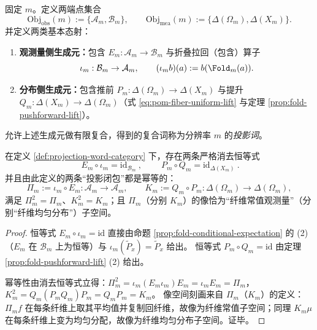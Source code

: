 \begin{definition}\label{def:projection-word-category}
固定 \(m\)。定义两端点集合
\[
\mathrm{Obj}_{\mathrm{obs}}(m):=\{\mathcal{A}_m,\mathcal{B}_m\},\qquad
\mathrm{Obj}_{\mathrm{mea}}(m):=\{\Delta(\Omega_m),\Delta(X_m)\}.
\]
并定义两类基本态射：
\begin{enumerate}
  \item \textbf{观测量侧生成元：}包含 \(E_m:\mathcal{A}_m\to\mathcal{B}_m\) 与折叠拉回（包含）算子
  \[
  \iota_m:\mathcal{B}_m\to\mathcal{A}_m,\qquad
  (\iota_m b)(a):=b(\Fold_m(a)).
  \]
  \item \textbf{分布侧生成元：}包含推前 \(P_m:\Delta(\Omega_m)\to\Delta(X_m)\) 与提升 \(Q_m:\Delta(X_m)\to\Delta(\Omega_m)\)（式 \eqref{eq:pom-fiber-uniform-lift} 与定理 \ref{prop:fold-pushforward-lift}）。
\end{enumerate}
允许上述生成元做有限复合，得到的复合词称为分辨率 \(m\) 的\emph{投影词}。
\end{definition}

\begin{proposition}[基本消去规则与幂等投影]\label{prop:projection-word-rewrite}
在定义 \ref{def:projection-word-category} 下，存在两条严格消去恒等式
\[
\boxed{\ E_m\circ \iota_m=\mathrm{id}_{\mathcal{B}_m}\ },\qquad
\boxed{\ P_m\circ Q_m=\mathrm{id}_{\Delta(X_m)}\ }.
\]
并且由此定义的两条“投影闭包”都是幂等的：
\[
\Pi_m:=\iota_m\circ E_m:\mathcal{A}_m\to\mathcal{A}_m,\qquad
K_m:=Q_m\circ P_m:\Delta(\Omega_m)\to\Delta(\Omega_m),
\]
满足 \(\Pi_m^2=\Pi_m\)、\(K_m^2=K_m\)；且 \(\Pi_m\)（分别 \(K_m\)）的像恰为“纤维常值观测量”（分别“纤维均匀分布”）子空间。
\end{proposition}
\begin{proof}
恒等式 \(E_m\circ\iota_m=\mathrm{id}\) 直接由命题 \ref{prop:fold-conditional-expectation} 的 (2)（\(E_m\) 在 \(\mathcal{B}_m\) 上为恒等）与 \(\iota_m(\widetilde P_x)=\widetilde P_x\) 给出。
恒等式 \(P_m\circ Q_m=\mathrm{id}\) 由定理 \ref{prop:fold-pushforward-lift} (2) 给出。
\par
幂等性由消去恒等式立得：\(\Pi_m^2=\iota_m(E_m\iota_m)E_m=\iota_mE_m=\Pi_m\)，\(K_m^2=Q_m(P_mQ_m)P_m=Q_mP_m=K_m\)。
像空间刻画来自 \(\Pi_m\)（\(K_m\)）的定义：\(\Pi_m f\) 在每条纤维上取其平均值并复制回纤维，故像为纤维常值子空间；同理 \(K_m\mu\) 在每条纤维上变为均匀分配，故像为纤维均匀分布子空间。证毕。
\end{proof}

